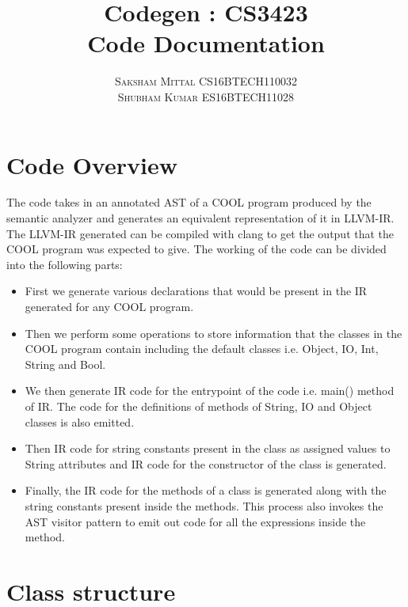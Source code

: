 \documentclass{article}
\begin{document}
\title
{\Huge \textbf{Codegen : CS3423}\\ 
\huge Code Documentation }
\author{\textsc{Saksham Mittal CS16BTECH110032} \\ 
\textsc{Shubham Kumar ES16BTECH11028} \\}

\maketitle
\vspace{350px}

\tableofcontents{}
\vspace{400px}

\section{Code Overview}
The code takes in an annotated AST of a COOL program produced by the semantic analyzer and generates an equivalent representation of it in LLVM-IR. The LLVM-IR generated can be compiled with clang to get the output that the COOL program was expected to give.
The working of the code can be divided into the following parts: \\
\begin{itemize}

    \item First we generate various declarations that would be present in the IR generated for any COOL program.
    \item Then we perform some operations to store information that the classes in the COOL program contain including the default classes i.e. Object, IO, Int, String and Bool.
    \item We then generate IR code for the entrypoint of the code i.e. main() method of IR. The code for the definitions of methods of String, IO and Object classes is also emitted.
    \item Then IR code for string constants present in the class as assigned values to String attributes and IR code for the constructor of the class is generated.
    \item Finally, the IR code for the methods of a class is generated along with the string constants present inside the methods. This process also invokes the AST visitor pattern to emit out code for all the expressions inside the method.

\end{itemize}

\section{Class structure}
\end{document}

